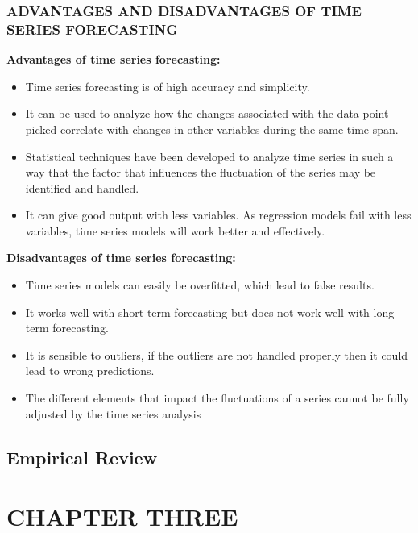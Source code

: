 \documentclass[12pt,a4paper]{article}
\begin{document}
\begin{flushleft}
		\subsubsection{ADVANTAGES AND DISADVANTAGES OF TIME SERIES FORECASTING}
		\textbf{Advantages of time series forecasting:}
		\begin{itemize}
		\item	Time series forecasting is of high accuracy and simplicity.
		\item	 It can be used to analyze how the changes associated with the data point picked correlate with changes in other variables during the same time span.
		\item	Statistical techniques have been developed to analyze time series in such a way that the factor that influences the fluctuation of the series may be identified and handled.
		\item	It can give good output with less variables. As regression models fail with less variables, time series models will work better and effectively.
		\end{itemize}
		\textbf{Disadvantages of time series forecasting:}
		\begin{itemize}
			\item 	Time series models can easily be overfitted, which lead to false results.
			\item	It works well with short term forecasting but does not work well with long term forecasting.
			\item	It is sensible to outliers, if the outliers are not handled properly then it could lead to wrong predictions.
			\item	The different elements that impact the fluctuations of a series cannot be fully adjusted by the time series analysis
		\end{itemize}

		
		\subsubsection{}
		\subsubsection{}
		\subsection{Empirical Review}
		\section{CHAPTER THREE}

\end{flushleft}
\end{document}
